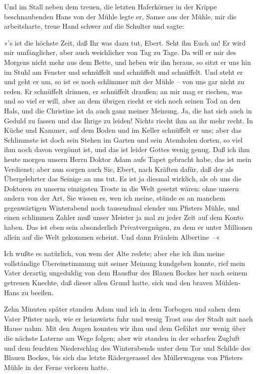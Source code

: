 Und im Stall neben dem treuen, die letzten Haferkörner in der
Krippe beschnaubenden Hans von der Mühle legte er, Samse aus der
Mühle, mir die arbeitsharte, treue Hand schwer auf die Schulter und
sagte:

»'s ist die höchste Zeit, daß Ihr was dazu tut, Ebert. Seht ihn
Euch an! Er wird mir umfänglicher, aber auch weichlicher von Tag zu
Tage. Da will er mir des Morgens nicht mehr aus dem Bette, und
heben wir ihn heraus, so sitzt er uns hin im Stuhl am Fenster und
schnüffelt und schnüffelt und schnüffelt. Und steht er und geht er
um, so ist es noch schlimmer mit der Mühle – von uns gar nicht zu
reden. Er schnüffelt drinnen, er schnüffelt draußen; an mir mag er
riechen, was und so viel er will, aber an dem übrigen riecht er
sich noch seinen Tod an den Hals, und die Christine ist da auch
ganz meiner Meinung. Ja, die hat sich auch in Geduld zu fassen und
das Ihrige zu leiden! Nichts riecht ihm an ihr mehr recht. In Küche
und Kammer, auf dem Boden und im Keller schnüffelt er uns; aber das
Schlimmste ist doch sein Stehen im Garten und sein Atemholen
dorten, so viel ihm noch davon vergönnt ist, und das ist leider
Gottes wenig genug. Daß ich ihm heute morgen unsern Herrn Doktor
Adam aufs Tapet gebracht habe, das ist mein Verdienst; aber nun
sorgen auch Sie, Ebert, nach Kräften dafür, daß der als
Übergelehrter das Seinige an uns tut. Es ist ja diesmal wirklich,
als ob uns die Doktoren zu unserm einzigsten Troste in die Welt
gesetzt wären: ohne unsern andern von der Art, Sie wissen es, wen
ich meine, stünde es an manchem gegenwärtigen Winterabend noch
tausendmal elender um Pfisters Mühle, und einen schlimmen Zahler
muß unser Meister ja mal zu jeder Zeit auf dem Konto haben. Das ist
eben sein absonderlich Privatvergnügen, zu dem er unter Millionen
allein auf die Welt gekommen scheint. Und dann Fräulein
Albertine~–«

Ich wußte es natürlich, von wem der Alte redete; aber ehe ich ihm
meine vollständige Übereinstimmung mit seiner Meinung kundgeben
konnte, rief mein Vater derartig ungeduldig von dem Hausflur des
Blauen Bockes her nach seinem getreuen Knechte, daß dieser allen
Grund hatte, sich und den braven Mühlen-Hans zu beeilen.

Zehn Minuten später standen Adam und ich in dem Torbogen und sahen
dem Vater Pfister nach, wie er heimwärts fuhr und wenig Trost aus
der Stadt mit nach Hause nahm. Mit den Augen konnten wir ihm und
dem Gefährt nur wenig über die nächste Laterne am Wege folgen; aber
wir standen in der scharfen Zugluft und dem feuchten Niederschlag
des Winterabends unter dem Tor und Schilde des Blauen Bockes, bis
sich das letzte Rädergerassel des Müllerwagens von Pfisters Mühle
in der Ferne verloren hatte.

